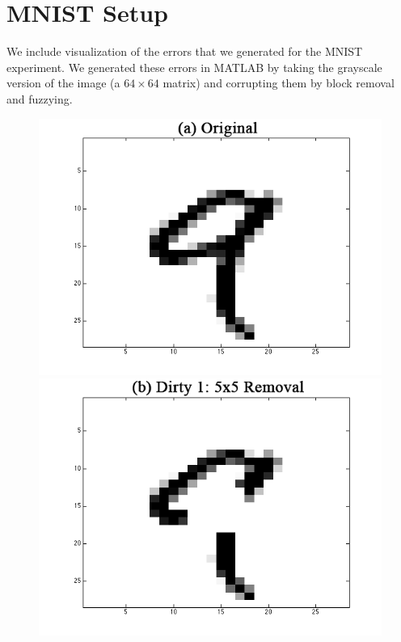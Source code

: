\vspace{0.5em}

\section{MNIST Setup}
We include visualization of the errors that we generated for the MNIST experiment.
We generated these errors in MATLAB by taking the grayscale version of the image (a $64\times 64$ matrix) and corrupting them by block removal and fuzzying.

\begin{figure}[ht]
\centering
\includegraphics[scale=0.20]{exp/original.png}
 \includegraphics[scale=0.20]{exp/5x5removal.png}

\end{figure}
